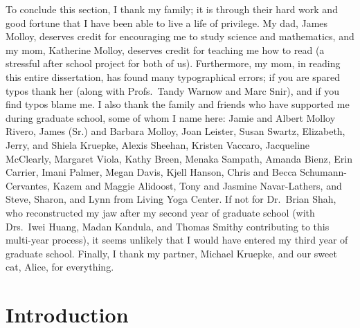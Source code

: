 \documentclass[tocnosub, noragright, centerchapter, fullpagesingle, 12pt]{uiuc_csthesis18}
\theoremstyle{definition}
\numberwithin{algocf}{chapter}     %
\begin{document}
\begin{acknowledgments}
To conclude this section, I thank my family; it is through their hard work and good fortune that I have been able to live a life of privilege.
My dad, James Molloy, deserves credit for encouraging me to study science and mathematics, and my mom, Katherine Molloy, deserves credit for teaching me how to read (a stressful after school project for both of us).
Furthermore, my mom, in reading this entire dissertation, has found many typographical errors; if you are spared typos thank her (along with Profs.~Tandy Warnow and Marc Snir), and if you find typos blame me.
I also thank the family and friends who have supported me during graduate school, some of whom I name here: Jamie and Albert  Molloy Rivero, James (Sr.) and Barbara Molloy, Joan Leister, Susan Swartz, Elizabeth, Jerry, and Shiela Kruepke, Alexis Sheehan, Kristen Vaccaro, Jacqueline McClearly, Margaret Viola, Kathy Breen, Menaka Sampath, Amanda Bienz, Erin Carrier, Imani Palmer, Megan Davis, Kjell Hanson, Chris and Becca Schumann-Cervantes, Kazem and Maggie Alidoost, Tony and Jasmine Navar-Lathers, and Steve, Sharon, and Lynn from Living Yoga Center.
If not for Dr.~Brian Shah, who reconstructed my jaw after my second year of graduate school (with Drs.~Iwei Huang, Madan Kandula, and Thomas Smithy contributing to this multi-year process), it seems unlikely that I would have entered my third year of graduate school.
Finally, I thank my partner, Michael Kruepke, and our sweet cat, Alice, for everything.
\end{acknowledgments}

%
\tableofcontents

%
\mainmatter

\chapter{Introduction}
\label{chapter:introduction}

\end{document}
